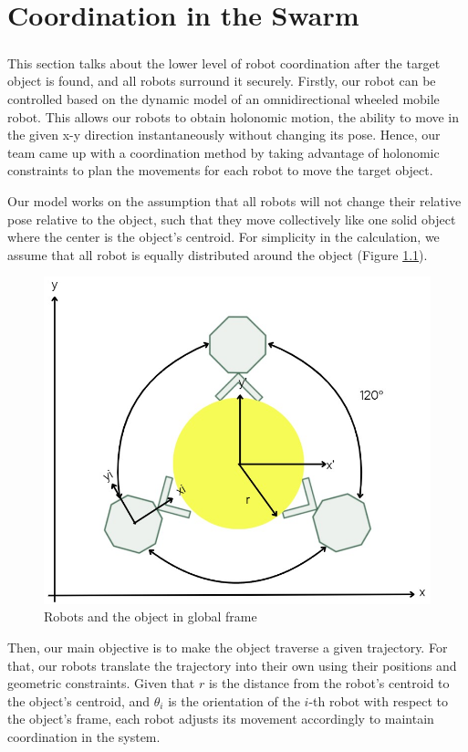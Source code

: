 \chapter{Coordination in the Swarm}

\paragraph*{}
This section talks about the lower level of robot coordination after the target object is found, and all robots surround it securely. Firstly, our robot can be controlled based on the dynamic model of an omnidirectional wheeled mobile robot. This allows our robots to obtain holonomic motion, the ability to move in the given x-y direction instantaneously without changing its pose. Hence, our team came up with a coordination method by taking advantage of holonomic constraints to plan the movements for each robot to move the target object.

Our model works on the assumption that all robots will not change their relative pose relative to the object, such that they move collectively like one solid object where the center is the object's centroid. For simplicity in the calculation, we assume that all robot is equally distributed around the object (Figure \ref{fig:coordination-diagram}).


\begin{figure} [H]
    \centering
    \includegraphics[width=0.3\linewidth]{assets/images/coordination/robots_with_object.jpg}
    \caption{Robots and the object in global frame}
    \label{fig:coordination-diagram}
\end{figure}

Then, our main objective is to make the object traverse a given trajectory. For that, our robots translate the trajectory into their own using their positions and geometric constraints. Given that \( r \) is the distance from the robot's centroid to the object's centroid, and \( \theta_i \) is the orientation of the \( i \)-th robot with respect to the object's frame, each robot adjusts its movement accordingly to maintain coordination in the system.

